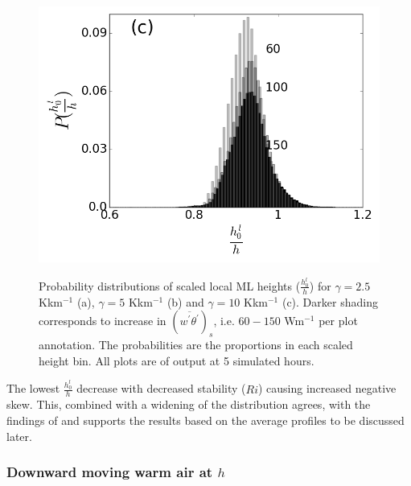 \begin{figure}[htbp]
\begin{center}
{                \includegraphics[scale=.3]{figures/Scaled_ML_Height_hist_10}}\\      
\end{center}       

        \caption[Local Scaled ML Height Distributions]{Probability distributions of scaled local ML heights ($\frac{h^{l}_{0}}{h}$) for $\gamma = 2.5$ Kkm$^{-1}$ (a), $\gamma = 5$ Kkm$^{-1}$ (b) and $\gamma = 10$ Kkm$^{-1}$ (c). Darker shading corresponds to increase in $(\overline{w^{'}\theta^{'}})_{s}$, i.e. $60 - 150$ Wm$^{-1}$ per plot annotation.  The probabilities are the proportions in each scaled height bin. All plots are of output at 5 simulated hours.}
    
        \label{fig:localhdist}
\end{figure}

The lowest $\frac{h^{l}_{0}}{h}$ decrease with decreased stability ($Ri$) causing increased negative skew. This, combined with a widening of the distribution agrees, with the findings of \cite{SullMoengStev} and supports the results based on the average profiles to be discussed later. \\  

\subsubsection{Downward moving warm air at $h$}
\label{subsubsec:downwarm}

